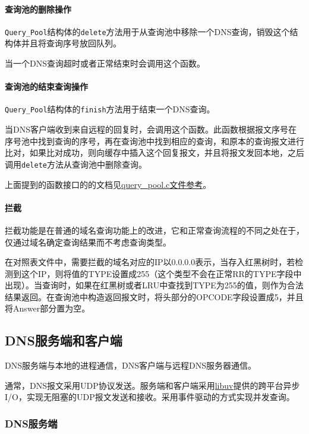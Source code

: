 \documentclass[lang=cn,11pt,a4paper,cite=authornum]{paper}
\begin{document}
\paragraph{查询池的删除操作}

\texttt{Query_Pool}结构体的\texttt{delete}方法用于从查询池中移除一个DNS查询，销毁这个结构体并且将查询序号放回队列。

当一个DNS查询超时或者正常结束时会调用这个函数。

\paragraph{查询池的结束查询操作}

\texttt{Query_Pool}结构体的\texttt{finish}方法用于结束一个DNS查询。

当DNS客户端收到来自远程的回复时，会调用这个函数。此函数根据报文序号在序号池中找到查询的序号，再在查询池中找到相应的查询，和原本的查询报文进行比对，如果比对成功，则向缓存中插入这个回复报文，并且将报文发回本地，之后调用\texttt{delete}方法从查询池中删除查询。

上面提到的函数接口的的文档见\href{run:./APIdoc/query__pool_8c.html}{query\_pool.c文件参考}。

\paragraph{拦截}

拦截功能是在普通的域名查询功能上的改进，它和正常查询流程的不同之处在于，仅通过域名确定查询结果而不考虑查询类型。

在对照表文件中，需要拦截的域名对应的IP以0.0.0.0表示，当存入红黑树时，若检测到这个IP，则将值的TYPE设置成255（这个类型不会在正常RR的TYPE字段中出现）。当查询时，如果在红黑树或者LRU中查找到TYPE为255的值，则作为合法结果返回。在查询池中构造返回报文时，将头部分的OPCODE字段设置成5，并且将Answer部分置为空。

\subsection{DNS服务端和客户端}

DNS服务端与本地的进程通信，DNS客户端与远程DNS服务器通信。

通常，DNS报文采用UDP协议发送。服务端和客户端采用\href{https://libuv.org/}{libuv}提供的跨平台异步I/O，实现无阻塞的UDP报文发送和接收。采用事件驱动的方式实现并发查询。

\subsubsection{DNS服务端}
\end{document}

